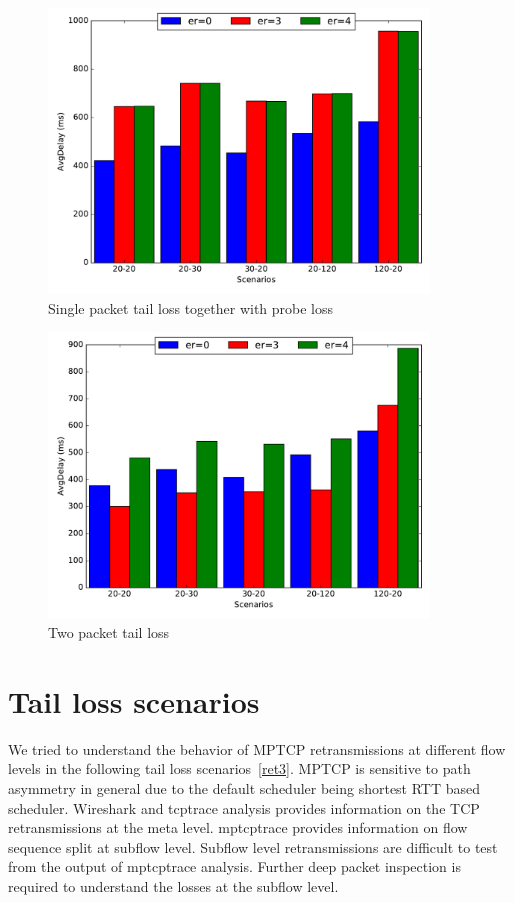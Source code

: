 \documentclass[12pt,draftcls,onecolumn]{IEEEtran}
\begin{document}
\begin{figure}[!ht]
\begin{center}
\includegraphics[angle=0, width=0.9\textwidth, natwidth=578.16,natheight=433.62]{plots/1PP.pdf}
\caption{Single packet tail loss together with probe loss}\label{1pp}
\end{center}
\end{figure}


\begin{figure}[!ht]
\begin{center}
\includegraphics[angle=0, width=0.9\textwidth,natwidth=578.16,natheight=433.62]{plots/2P.pdf}
\caption{Two packet tail loss}\label{2p}
\end{center}
\end{figure}


\section{Tail loss scenarios}
We tried to understand the behavior of MPTCP retransmissions at different flow levels in the following tail loss scenarios~\ref{ret3}.
MPTCP is sensitive to path asymmetry in general due to the default scheduler being shortest RTT based scheduler. Wireshark and tcptrace
analysis provides information on the TCP retransmissions at the meta level. mptcptrace provides information on flow sequence split at 
subflow level. Subflow level retransmissions are difficult to test from the output of mptcptrace analysis. Further deep packet inspection
is required to understand the losses at the subflow level.
\end{document}
